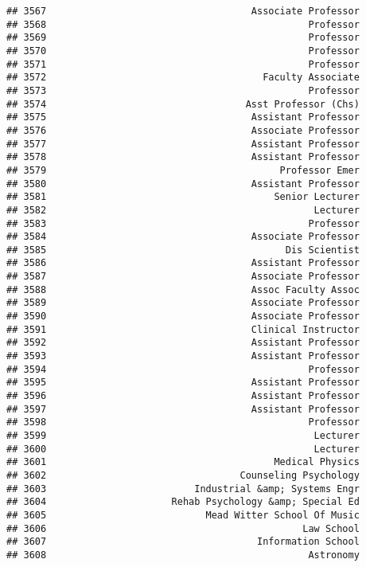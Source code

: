 \documentclass[
]{article}
\begin{document}
\begin{verbatim}
## 3567                                    Associate Professor
## 3568                                              Professor
## 3569                                              Professor
## 3570                                              Professor
## 3571                                              Professor
## 3572                                      Faculty Associate
## 3573                                              Professor
## 3574                                   Asst Professor (Chs)
## 3575                                    Assistant Professor
## 3576                                    Associate Professor
## 3577                                    Assistant Professor
## 3578                                    Assistant Professor
## 3579                                         Professor Emer
## 3580                                    Assistant Professor
## 3581                                        Senior Lecturer
## 3582                                               Lecturer
## 3583                                              Professor
## 3584                                    Associate Professor
## 3585                                          Dis Scientist
## 3586                                    Assistant Professor
## 3587                                    Associate Professor
## 3588                                    Assoc Faculty Assoc
## 3589                                    Associate Professor
## 3590                                    Associate Professor
## 3591                                    Clinical Instructor
## 3592                                    Assistant Professor
## 3593                                    Assistant Professor
## 3594                                              Professor
## 3595                                    Assistant Professor
## 3596                                    Assistant Professor
## 3597                                    Assistant Professor
## 3598                                              Professor
## 3599                                               Lecturer
## 3600                                               Lecturer
## 3601                                        Medical Physics
## 3602                                  Counseling Psychology
## 3603                          Industrial &amp; Systems Engr
## 3604                      Rehab Psychology &amp; Special Ed
## 3605                            Mead Witter School Of Music
## 3606                                             Law School
## 3607                                     Information School
## 3608                                              Astronomy

\end{verbatim}
\end{document}
